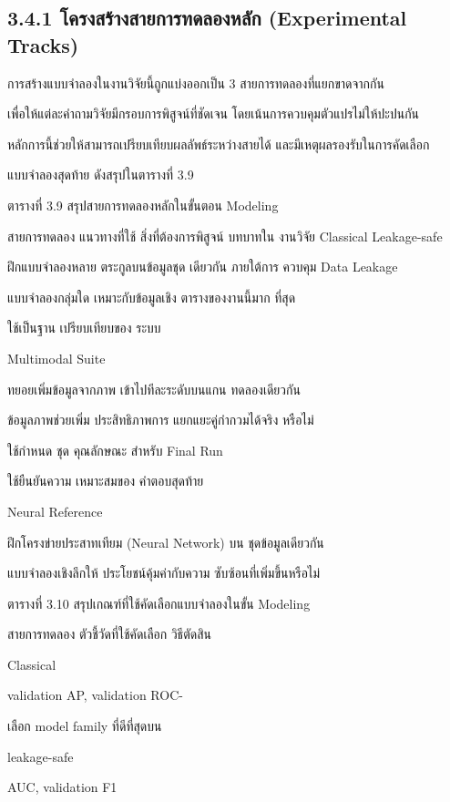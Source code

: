\documentclass[12pt,a4paper]{report}
\begin{document}
\subsection*{3.4.1 โครงสร้างสายการทดลองหลัก (Experimental Tracks)}
การสร้างแบบจำลองในงานวิจัยนี้ถูกแบ่งออกเป็น 3 สายการทดลองที่แยกขาดจากกัน\par
เพื่อให้แต่ละคำถามวิจัยมีกรอบการพิสูจน์ที่ชัดเจน โดยเน้นการควบคุมตัวแปรไม่ให้ปะปนกัน\par
หลักการนี้ช่วยให้สามารถเปรียบเทียบผลลัพธ์ระหว่างสายได้ และมีเหตุผลรองรับในการคัดเลือก\par
แบบจำลองสุดท้าย ดังสรุปในตารางที่ 3.9\par
\clearpage
\begin{center}\small ตารางที่ 3.9 สรุปสายการทดลองหลักในขั้นตอน Modeling\end{center}
สายการทดลอง แนวทางที่ใช้ สิ่งที่ต้องการพิสูจน์ บทบาทใน งานวิจัย Classical Leakage-safe\par
ฝึกแบบจำลองหลาย ตระกูลบนข้อมูลชุด เดียวกัน ภายใต้การ ควบคุม Data Leakage\par
แบบจำลองกลุ่มใด เหมาะกับข้อมูลเชิง ตารางของงานนี้มาก ที่สุด\par
ใช้เป็นฐาน เปรียบเทียบของ ระบบ\par
Multimodal Suite\par
ทยอยเพิ่มข้อมูลจากภาพ เข้าไปทีละระดับบนแกน ทดลองเดียวกัน\par
ข้อมูลภาพช่วยเพิ่ม ประสิทธิภาพการ แยกแยะคู่กำกวมได้จริง หรือไม่\par
ใช้กำหนด ชุด คุณลักษณะ สำหรับ Final Run\par
ใช้ยืนยันความ เหมาะสมของ คำตอบสุดท้าย\par
Neural Reference\par
ฝึกโครงข่ายประสาทเทียม (Neural Network) บน ชุดข้อมูลเดียวกัน\par
แบบจำลองเชิงลึกให้ ประโยชน์คุ้มค่ากับความ ซับซ้อนที่เพิ่มขึ้นหรือไม่\par
\begin{center}\small ตารางที่ 3.10 สรุปเกณฑ์ที่ใช้คัดเลือกแบบจำลองในขั้น Modeling\end{center}
สายการทดลอง ตัวชี้วัดที่ใช้คัดเลือก วิธีตัดสิน\par
Classical\par
validation AP, validation ROC-\par
เลือก model family ที่ดีที่สุดบน\par
leakage-safe\par
AUC, validation F1\par
\end{document}
